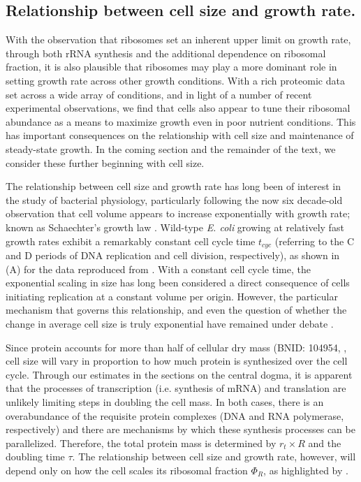 \subsection{Relationship between cell size and growth rate.}
With the observation that ribosomes set an inherent upper limit on growth
rate, through both rRNA synthesis and the additional dependence on ribosomal
fraction, it is also plausible that ribosomes may play a more dominant role
in setting growth rate across other growth conditions. With a rich proteomic
data set across a wide array of conditions, and in light of a number of
recent experimental observations, we find that cells also appear to tune
their ribosomal abundance as a means to maximize growth even in poor nutrient
conditions. This has important consequences on the relationship with cell
size and maintenance of steady-state growth. In the coming section and the
remainder of the text, we consider these further beginning with cell size.

The relationship between cell size and growth rate has long been of interest in
the study of bacterial physiology, particularly following the now six decade-old observation
that cell volume appears to increase exponentially with growth rate; known as
Schaechter's growth law  \citep{schaechter1958, taheriaraghi2015}. Wild-type
\textit{E. coli} growing at relatively fast growth rates exhibit a remarkably
constant cell cycle time $t_{cyc}$ (referring to the C and D periods of DNA
replication and cell division, respectively), as shown in
(A) for the data reproduced from \citep{si2017}.
With a constant cell cycle time, the exponential scaling in size has long been
considered a direct consequence of cells initiating replication at a constant
volume per origin. However, the particular mechanism that governs this
relationship, and even the question of whether the change in average cell size
is truly exponential  have remained under debate \citep{si2017, harris2018}.

Since protein accounts for more than half of cellular dry mass (BNID: 104954,
\cite{milo2010, bremer2008, basan2015}, cell size will vary in proportion to how much protein is
synthesized over the cell cycle.  Through our estimates in the sections on the
central dogma, it is apparent that the processes of transcription (i.e.
synthesis of mRNA) and translation are unlikely limiting steps in doubling the
cell mass. In both cases, there is an overabundance of the requisite protein
complexes (DNA and RNA polymerase, respectively) and there are mechanisms by
which these synthesis processes can be parallelized. Therefore, the total protein mass is determined by $r_t \times R$ and the doubling time
$\tau$. The relationship between cell size and growth rate, however, will
depend only on how the cell scales its ribosomal fraction $\Phi_R$, as highlighted by
.


